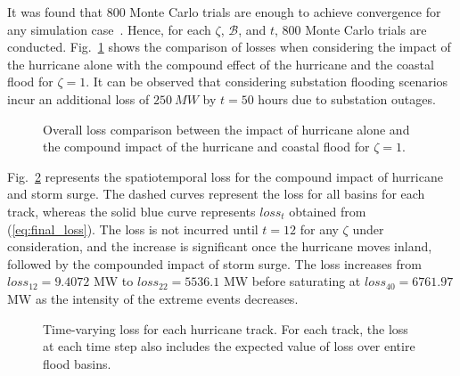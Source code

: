 It was found that 800 Monte Carlo trials are enough to achieve convergence for any simulation case~\cite{9917119}. Hence, for each $\zeta$, $\mathcal{B}$, and $t$, 800 Monte Carlo trials are conducted. Fig.~\ref{fig:hurricane_flood_compound} shows the comparison of losses when considering the impact of the hurricane alone with the compound effect of the hurricane and the coastal flood for $\zeta=1$. It can be observed that considering substation flooding scenarios incur an additional loss of $250~MW$ by $t=50$ hours due to substation outages.   

\begin{figure}
    \centering
    \caption{Overall loss comparison between the impact of hurricane alone and the compound impact of the hurricane and coastal flood for $\zeta = 1$.}
    \label{fig:hurricane_flood_compound}
\end{figure}

Fig.~\ref{fig:final_losses} represents the spatiotemporal loss for the compound impact of hurricane and storm surge. The dashed curves represent the loss for all basins for each track, whereas the solid blue curve represents $loss_t$ obtained from (\ref{eq:final_loss}). The loss is not incurred until $t=12$ for any $\zeta$ under consideration, and the increase is significant once the hurricane moves inland, followed by the compounded impact of storm surge. The loss increases from $loss_{12} = 9.4072$ MW to $loss_{22} = 5536.1$ MW before saturating at $loss_{40} = 6761.97$ MW as the intensity of the extreme events decreases.  

\begin{figure}[!h!]
    \centering
    \caption{Time-varying loss for each hurricane track. For each track, the loss at each time step also includes the expected value of loss over entire flood basins.}
    \label{fig:final_losses}
\end{figure}
